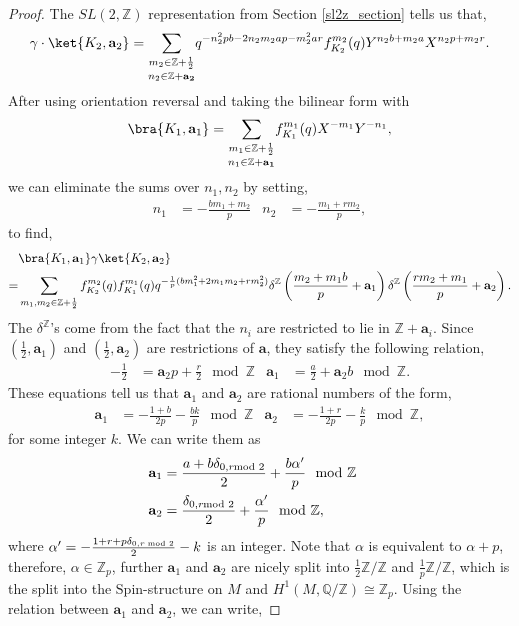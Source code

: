 \documentclass{article}
\newcommand{\Z}{{\mathbb Z}}
\newcommand{\Q}{{\mathbb Q}}
\numberwithin{corollary}{theorem}
\numberwithin{corollary}{proposition}
\begin{document}
\begin{proof}
    The $SL(2,\Z)$ representation from Section \ref{sl2z_section} tells us that,
$$\gamma \cdot \ket{K_2,\mathbf{a}_2} = \underset{n_2\in \Z+\mathbf{a_2}}{\sum_{m_2\in \Z+\frac{1}{2}}} q^{-n_2^2 p b -2 n_2m_2 a p-m_2^2 a r}f^{m_2}_{K_2}(q)  Y^{n_2 b +m_2 a} X^{n_2 p+m_2 r}.$$
After using orientation reversal and taking the bilinear form with $$\bra{K_1,\mathbf{a}_1} = \underset{n_1\in \Z+\mathbf{a_1}}{\sum_{m_1\in \Z+\frac{1}{2}}} f^{m_1}_{K_1}(q)   X^{-m_1} Y^{-n_1} ,$$ we can eliminate the sums over $n_1,n_2$ by setting, 
\begin{align*}
   n_1 &= - \frac{ b m_{1}  + m_{2}}{p} &  n_2 &= - \frac{m_1 + r m_2}{p},
\end{align*}
to find,
\begin{align*}
& \bra{K_1,\mathbf{a}_1}\gamma \ket{K_2,\mathbf{a}_2} \\
= & \sum_{m_1,m_2\in \Z+\frac{1}{2}}f^{m_2}_{K_2}(q)f^{m_1}_{K_1}(q) q^{-\frac{1}{p}(b m_{1}^{2}+2 m_{1} m_{2}+ r m_{2}^{2})}  \delta^\Z\left(\frac{m_2+m_1b}{p}+\mathbf{a}_1\right)\delta^\Z\left(\frac{r m_2+m_1}{p}+\mathbf{a}_2\right).
\end{align*}
The $\delta^\Z$'s come from the fact that the $n_i$ are restricted to lie in $\Z+\mathbf{a}_i$. Since $(\frac{1}{2},\mathbf{a}_{1})$ and $(\frac{1}{2},\mathbf{a}_{2})$ are restrictions of $\mathbf{a}$, they satisfy the following relation,
\begin{align*}
  -\frac{1}{2} & = \mathbf{a}_{2} p + \frac{r}{2} \mod \Z  & \mathbf{a}_{1} &= \frac{a}{2} + \mathbf{a}_{2} b \mod \Z   .
\end{align*}
These equations tell us that $\mathbf{a}_{1}$ and $\mathbf{a}_{2}$ are rational numbers of the form, 
\begin{align*}
    \mathbf{a}_{1} &= - \frac{1+b}{2 p} - \frac{b k }{p}  \mod \Z & \mathbf{a}_{2} & = - \frac{1+r}{2p }- \frac{ k }{p} \mod \Z, 
\end{align*}
for some integer $k$. We can write them as 
\begin{align}
   \mathbf{a}_{1} & = \frac{a+ b \delta_{0, r \hspace{-0.2cm} \mod 2} }{2}  + \frac{b \alpha^{\prime} }{p} \mod \Z \endline
   \mathbf{a}_{2} & =  \frac{\delta_{0, r \hspace{-0.2cm} \mod 2}}{2}  + \frac{\alpha^{\prime}}{p} \mod \Z,
\end{align}
where $\alpha^{\prime} =  -\frac{1+ r + p\delta_{0, r \hspace{-0.1cm}\mod 2} }{2} - k $ is an integer. Note that $\alpha$ is equivalent to $\alpha+ p$, therefore, $\alpha \in \Z_{p}$, further $\mathbf{a}_{1}$ and $\mathbf{a}_{2}$ are nicely split into $\frac{1}{2}\Z /\Z$ and $\frac{1}{p}\Z /\Z$, which is the split into the $\mathrm{Spin}$-structure on $M$ and $H^1(M,\Q/\Z) \cong \Z_p$. Using the relation between $\mathbf{a}_{1}$ and $\mathbf{a}_{2}$, we can write, 

\end{proof}
\end{document}
